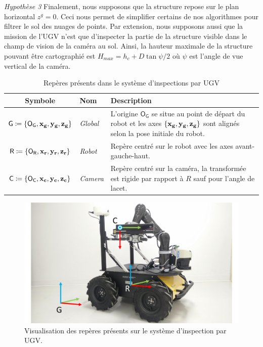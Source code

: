 \textit{Hypothèse 3} Finalement, nous supposons que la structure repose sur le plan horizontal $z^g = 0$. Ceci nous permet de simplifier certains de nos algorithmes pour filtrer le sol des nuages de points. Par extension, nous supposons aussi que la mission de l'UGV n'est que d'inspecter la partie de la structure visible dans le champ de vision de la caméra au sol. Ainsi, la hauteur maximale de la structure pouvant être cartographié est $H_{max} = h_c + D \tan{\psi/2}$ où $\psi$ est l'angle de vue vertical de la caméra.

\begin{table}[htp]
  \centering
  \setlength{\tabcolsep}{12pt}
  \begin{tabular}[htp]{|c|l|p{9cm}|}
    \hline
    Symbole & Nom                   & Description\\\hline
    $\mathsf{G} \coloneqq \{\mathsf{O_G}, \mathbf{x_g}, \mathbf{y_g}, \mathbf{z_g} \} $     &  \textit{Global}      & L'origine $\mathsf{O_G}$ se situe au point de départ du robot et les axes $\{\mathbf{x_g}, \mathbf{y_g}, \mathbf{z_g} \}$ sont alignés selon la pose initiale du robot.\\\hline
    $\mathsf{R} \coloneqq \{\mathsf{O_R}, \mathbf{x_r}, \mathbf{y_r}, \mathbf{z_r} \} $     &  \textit{Robot}       & Repère centré sur le robot avec les axes avant-gauche-haut.\\\hline
    $\mathsf{C} \coloneqq \{\mathsf{O_C}, \mathbf{x_c}, \mathbf{y_c}, \mathbf{z_c} \}$     &  \textit{Camera}      & Repère centré sur la caméra, la transformée est rigide par rapport à $R$ sauf pour l'angle de lacet. \\\hline
  \end{tabular}
  \setlength{\tabcolsep}{6pt}
  \caption{Repères présents dans le système d'inspections par UGV}
  \label{table:ugv_frames}
\end{table}

\begin{figure}[htp]
  \centering
  \includegraphics[width=0.8\linewidth]{images/husky}
  \caption{Visualisation des repères présents sur le système d'inspection par UGV.}
  \label{fig:ugv_frames}
\end{figure}

